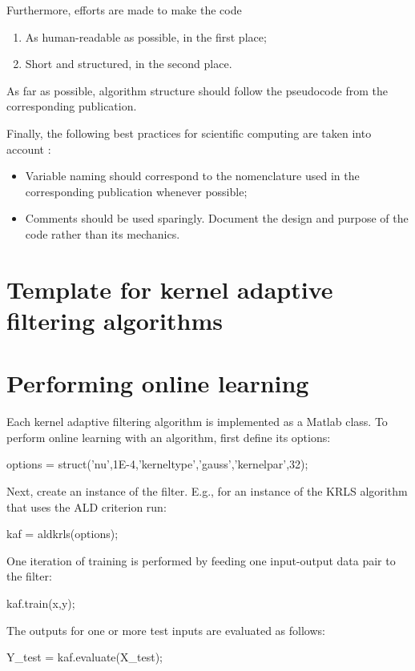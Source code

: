 \documentclass[]{report}
\begin{document}
Furthermore, efforts are made to make the code
\begin{enumerate}
\item As human-readable as possible, in the first place;
\item Short and structured, in the second place.
\end{enumerate}
As far as possible, algorithm structure should follow the pseudocode from the corresponding publication.

Finally, the following best practices for scientific computing are taken into account \cite{wilson2014best}:
\begin{itemize}
\item Variable naming should correspond to the nomenclature used in the corresponding publication whenever possible;
\item Comments should be used sparingly. Document the design and purpose of the code rather than its mechanics.
\end{itemize}

\section{Template for kernel adaptive filtering algorithms}



\section{Performing online learning}

Each kernel adaptive filtering algorithm is implemented as a Matlab class. To perform online learning with an algorithm, first define its options:
\begin{shortlisting}
options = struct('nu',1E-4,'kerneltype','gauss','kernelpar',32);
\end{shortlisting}
Next, create an instance of the filter. E.g., for an instance of the KRLS algorithm that uses the ALD criterion run:
\begin{shortlisting}
kaf = aldkrls(options);
\end{shortlisting}
One iteration of training is performed by feeding one input-output data pair to the filter:
\begin{shortlisting}
kaf.train(x,y);
\end{shortlisting}
The outputs for one or more test inputs are evaluated as follows:
\begin{shortlisting}
Y_test = kaf.evaluate(X_test);
\end{shortlisting}
\end{document}
